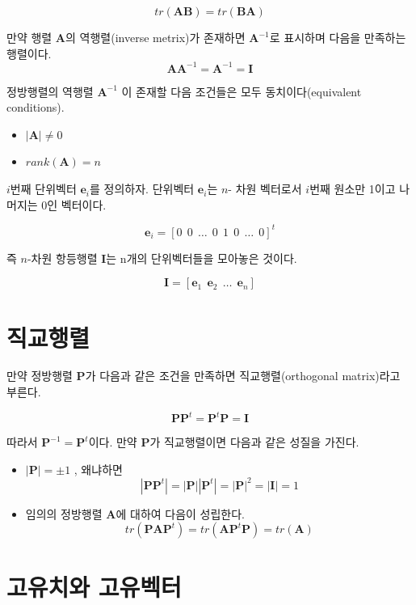 \documentclass[
]{book}
\providecommand{\tightlist}{%
  \setlength{\itemsep}{0pt}\setlength{\parskip}{0pt}}
\theoremstyle{definition}
\theoremstyle{definition}
\theoremstyle{definition}
\theoremstyle{remark}
\begin{document}
\[  tr(\bm A \bm B)  = tr( \bm B \bm A) \]

만약 행렬 \(\bm A\)의 역행렬(inverse metrix)가 존재하면 \(\bm A^{-1}\)로 표시하며 다음을 만족하는 행렬이다.
\[ \bm A \bm A^{-1} = \bm A^{-1} = \bm I \]

정방행렬의 역행렬 \(\bm A^{-1}\) 이 존재할 다음 조건들은 모두 동치이다(equivalent conditions).

\begin{itemize}
\tightlist
\item
  \(|\bm A| \ne 0\)
\item
  \(rank(\bm A) = n\)
\end{itemize}

\(i\)번째 단위벡터 \(\bm e_i\)를 정의하자. 단위벡터 \(\bm e_i\)는 \(n\)- 차원 벡터로서 \(i\)번째 원소만 1이고 나머지는 0인 벡터이다.

\[ \bm e_i = [0 ~~0 ~~\dots~~ 0 ~~ 1 ~~ 0 ~~ \dots ~~ 0 ]^t \]

즉 \(n\)-차원 항등행렬 \(\bm I\)는 n개의 단위벡터들을 모아놓은 것이다.

\[  \bm I = [ \bm e_1 ~~ \bm e_2 ~~ \dots ~~ \bm e_n ] \]

\hypertarget{uxc9c1uxad50uxd589uxb82c}{%
\section{직교행렬}\label{uxc9c1uxad50uxd589uxb82c}}

만약 정방행렬 \(\bm P\)가 다음과 같은 조건을 만족하면 직교행렬(orthogonal matrix)라고 부른다.

\[  \bm P \bm P^t = \bm P^t \bm P = \bm I \]

따라서 \(\bm P^{-1} = \bm P^t\)이다. 만약 \(\bm P\)가 직교행렬이면 다음과 같은 성질을 가진다.

\begin{itemize}
\item
  \(| \bm P | = \pm 1\) , 왜냐하면
  \[  | \bm P \bm P^t | = | \bm P | |\bm P^t |  = | \bm P|^2 = |\bm I| =1 \]
\item
  임의의 정방행렬 \(\bm A\)에 대하여 다음이 성립한다.
  \[ tr(\bm P \bm A \bm P^t) = tr(\bm A \bm P^t \bm P) = tr(\bm A) \]
\end{itemize}

\hypertarget{uxace0uxc720uxce58uxc640-uxace0uxc720uxbca1uxd130}{%
\section{고유치와 고유벡터}\label{uxace0uxc720uxce58uxc640-uxace0uxc720uxbca1uxd130}}
\end{document}
